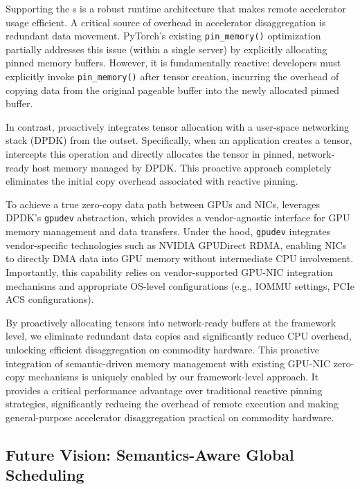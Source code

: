 Supporting the \lazytensor{}s is a robust runtime architecture that makes remote accelerator usage efficient. A critical source of overhead in accelerator disaggregation is redundant data movement. 
PyTorch's existing \texttt{pin\_memory()} optimization partially addresses this issue (within a single server) by explicitly allocating pinned memory buffers.
However, it is fundamentally reactive: developers must explicitly invoke \texttt{pin\_memory()} after tensor creation, incurring the overhead of copying data from the original pageable buffer into the newly allocated pinned buffer.


In contrast, \sys proactively integrates tensor allocation with a user-space networking stack (DPDK) from the outset. 
Specifically, when an application creates a tensor, \sys intercepts this operation and directly allocates the tensor in pinned, network-ready host memory managed by DPDK. 
This proactive approach completely eliminates the initial copy overhead associated with reactive pinning.

To achieve a true zero-copy data path between GPUs and NICs, \sys leverages DPDK's \texttt{gpudev} abstraction, which provides a vendor-agnostic interface for GPU memory management and data transfers.
Under the hood, \texttt{gpudev} integrates vendor-specific technologies such as NVIDIA GPUDirect RDMA, enabling NICs to directly DMA data into GPU memory without intermediate CPU involvement.
Importantly, this capability relies on vendor-supported GPU-NIC integration mechanisms and appropriate OS-level configurations (e.g., IOMMU settings, PCIe ACS configurations).

By proactively allocating tensors into network-ready buff\-ers at the framework level, we eliminate redundant data copies and significantly reduce CPU overhead, unlocking efficient disaggregation on commodity hardware.
This proactive integration of semantic-driven memory management with existing GPU-NIC zero-copy mechanisms is uniquely enabled by our framework-level approach. 
It provides a critical performance advantage over traditional reactive pinning strategies, significantly reducing the overhead of remote execution and making general-purpose accelerator disaggregation practical on commodity hardware.


\subsection{Future Vision: Semantics-Aware Global Scheduling}
\label{ssec:global_scheduling}

